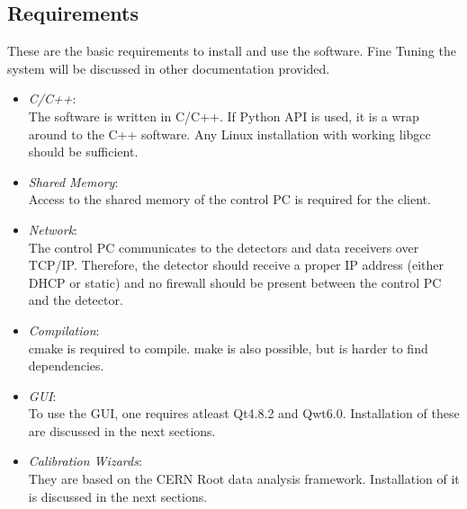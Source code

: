 \documentclass{article}
\begin{document}
\subsection{Requirements}
These are the basic requirements to install and use the software. Fine Tuning
the system will be discussed in other documentation provided.
\begin{itemize}

 \item \emph{C/C++}:\\
The software is written in C/C++. If Python API is used, it is a wrap around
to the C++ software.  Any Linux installation with working libgcc should be
sufficient.

 \item \emph{Shared Memory}:\\
Access to the shared memory of the control PC is required for the client.

 \item \emph{Network}:\\
The control PC communicates to the detectors and data receivers over TCP/IP.
Therefore, the detector should receive a proper IP address (either DHCP or
static) and no firewall should be present between the control PC and the
detector.

\item \emph{Compilation}:\\
cmake is required to compile. make is also possible, but is harder to find
dependencies.

\item \emph{GUI}:\\
To use the GUI, one requires atleast Qt4.8.2 and Qwt6.0. Installation of these
are discussed in the next sections.

\item \emph{Calibration Wizards}:\\
They are based on the CERN Root data analysis framework. Installation of it is
discussed in the next sections.

\end{itemize}
\end{document}
